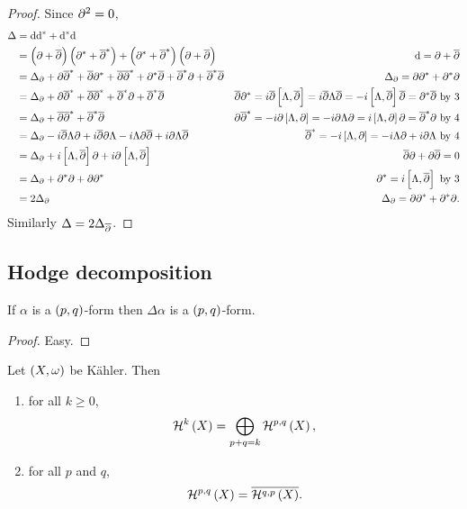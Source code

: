 \begin{proof}
Since $ \partial^2 = 0 $,
\begin{align*}
\Delta
& = \d\d^* + \d^*\d \\
& = \br{\da + \dab}\br{\da^* + \dab^*} + \br{\da^* + \dab^*}\br{\da + \dab} & \d = \da + \dab \\
& = \Delta_\da + \da\dab^* + \dab\da^* + \dab\dab^* + \da^*\dab + \dab^*\da + \dab^*\dab & \Delta_\da = \da\da^* + \da^*\da \\
& = \Delta_\da + \da\dab^* + \dab\dab^* + \dab^*\da + \dab^*\dab & \dab\da^* = i\dab\sbr{\Lambda, \dab} = i\dab\Lambda\dab = -i\sbr{\Lambda, \dab}\dab = \da^*\dab \ \text{by} \ 3 \\
& = \Delta_\da + \dab\dab^* + \dab^*\dab & \da\dab^* = -i\da\sbr{\Lambda, \da} = -i\da\Lambda\da = i\sbr{\Lambda, \da}\da = \dab^*\da \ \text{by} \ 4 \\
& = \Delta_\da - i\dab\Lambda\da + i\dab\da\Lambda - i\Lambda\da\dab + i\da\Lambda\dab & \dab^* = -i\sbr{\Lambda, \da} = -i\Lambda\da + i\da\Lambda \ \text{by} \ 4 \\
& = \Delta_\da + i\sbr{\Lambda, \dab}\da + i\da\sbr{\Lambda, \dab} & \dab\da + \da\dab = 0 \\
& = \Delta_\da + \da^*\da + \da\da^* & \da^* = i\sbr{\Lambda, \dab} \ \text{by} \ 3 \\
& = 2\Delta_\da & \Delta_\da = \da\da^* + \da^*\da.
\end{align*}
Similarly $ \Delta = 2\Delta_{\overline{\partial}} $.
\end{proof}

\subsection{Hodge decomposition}

\begin{lemma}
If $ \alpha $ is a $ \br{p, q} $-form then $ \Delta\alpha $ is a $ \br{p, q} $-form.
\end{lemma}

\begin{proof}
Easy.
\end{proof}

\begin{theorem}
\label{thm:6.35}
Let $ \br{X, \omega} $ be K\"ahler. Then
\begin{enumerate}
\item for all $ k \ge 0 $,
$$ \HHH^k\br{X} = \bigoplus_{p + q = k} \HHH^{p, q}\br{X}, $$
\item for all $ p $ and $ q $,
$$ \HHH^{p, q}\br{X} = \overline{\HHH^{q, p}\br{X}}. $$
\end{enumerate}
\end{theorem}

